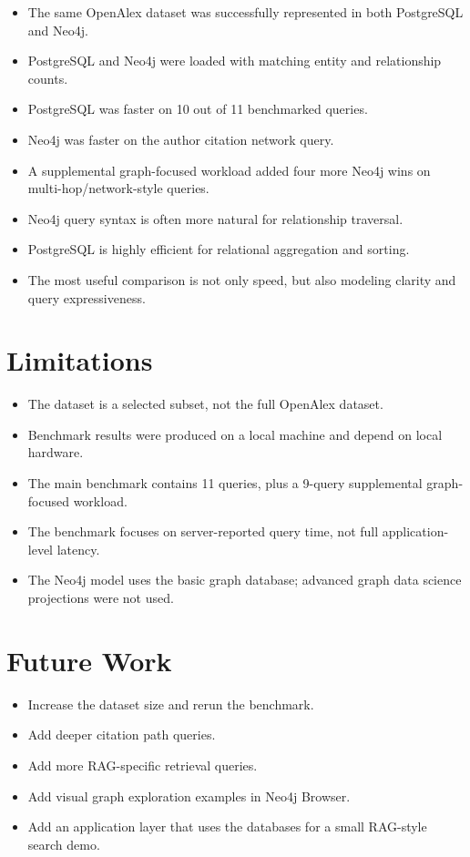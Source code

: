 \documentclass[11pt]{article}
\begin{document}
\begin{itemize}
    \item The same OpenAlex dataset was successfully represented in both PostgreSQL and Neo4j.
    \item PostgreSQL and Neo4j were loaded with matching entity and relationship counts.
    \item PostgreSQL was faster on 10 out of 11 benchmarked queries.
    \item Neo4j was faster on the author citation network query.
    \item A supplemental graph-focused workload added four more Neo4j wins on multi-hop/network-style queries.
    \item Neo4j query syntax is often more natural for relationship traversal.
    \item PostgreSQL is highly efficient for relational aggregation and sorting.
    \item The most useful comparison is not only speed, but also modeling clarity and query expressiveness.
\end{itemize}

\section{Limitations}

\begin{itemize}
    \item The dataset is a selected subset, not the full OpenAlex dataset.
    \item Benchmark results were produced on a local machine and depend on local hardware.
    \item The main benchmark contains 11 queries, plus a 9-query supplemental graph-focused workload.
    \item The benchmark focuses on server-reported query time, not full application-level latency.
    \item The Neo4j model uses the basic graph database; advanced graph data science projections were not used.
\end{itemize}

\section{Future Work}

\begin{itemize}
    \item Increase the dataset size and rerun the benchmark.
    \item Add deeper citation path queries.
    \item Add more RAG-specific retrieval queries.
    \item Add visual graph exploration examples in Neo4j Browser.
    \item Add an application layer that uses the databases for a small RAG-style search demo.
\end{itemize}
\end{document}
